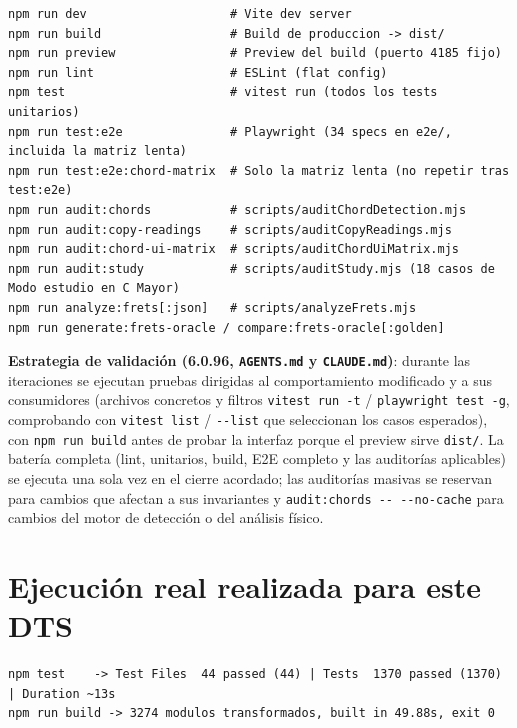 \documentclass[a4paper,11pt,oneside]{report}
\begin{document}
\begin{lstlisting}
npm run dev                    # Vite dev server
npm run build                  # Build de produccion -> dist/
npm run preview                # Preview del build (puerto 4185 fijo)
npm run lint                   # ESLint (flat config)
npm test                       # vitest run (todos los tests unitarios)
npm run test:e2e               # Playwright (34 specs en e2e/, incluida la matriz lenta)
npm run test:e2e:chord-matrix  # Solo la matriz lenta (no repetir tras test:e2e)
npm run audit:chords           # scripts/auditChordDetection.mjs
npm run audit:copy-readings    # scripts/auditCopyReadings.mjs
npm run audit:chord-ui-matrix  # scripts/auditChordUiMatrix.mjs
npm run audit:study            # scripts/auditStudy.mjs (18 casos de Modo estudio en C Mayor)
npm run analyze:frets[:json]   # scripts/analyzeFrets.mjs
npm run generate:frets-oracle / compare:frets-oracle[:golden]
\end{lstlisting}

\textbf{Estrategia de validación (6.0.96, \lstinline!AGENTS.md! y \lstinline!CLAUDE.md!)}: durante las iteraciones se ejecutan pruebas dirigidas al comportamiento modificado y a sus consumidores (archivos concretos y filtros \lstinline!vitest run -t! / \lstinline!playwright test -g!, comprobando con \lstinline!vitest list! / \lstinline!--list! que seleccionan los casos esperados), con \lstinline!npm run build! antes de probar la interfaz porque el preview sirve \lstinline!dist/!. La batería completa (lint, unitarios, build, E2E completo y las auditorías aplicables) se ejecuta una sola vez en el cierre acordado; las auditorías masivas se reservan para cambios que afectan a sus invariantes y \lstinline!audit:chords -- --no-cache! para cambios del motor de detección o del análisis físico.

\section{Ejecución real realizada para este DTS}
\label{sec:15.2}

\begin{lstlisting}
npm test    -> Test Files  44 passed (44) | Tests  1370 passed (1370) | Duration ~13s
npm run build -> 3274 modulos transformados, built in 49.88s, exit 0
\end{lstlisting}
\end{document}
